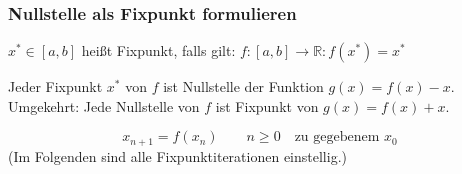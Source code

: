 \subsubsection*{Nullstelle als Fixpunkt formulieren}

\begin{definition}
	$x^* \in [a, b]$ heißt Fixpunkt, falls gilt: $f: [a, b] \rightarrow \mathbb{R}: f(x^*) = x^*$
\end{definition}
\begin{lemma}
	Jeder Fixpunkt $x^*$ von $f$ ist Nullstelle der Funktion $g(x) = f(x) - x$. \\
	Umgekehrt: Jede Nullstelle von $f$ ist Fixpunkt von $g(x) = f(x) + x$.
\end{lemma}
\begin{definition}\flush
	\begin{equation*}
		x_{n + 1} = f(x_n) \qquad n \geq 0 \quad \text{zu gegebenem $x_0$}
	\end{equation*}
	(Im Folgenden sind alle Fixpunktiterationen einstellig.)
\end{definition}

